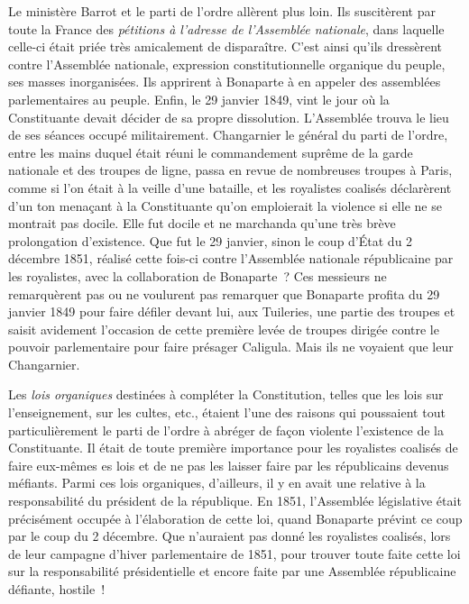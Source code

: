 \documentclass[french,twoside]{book} %
\begin{document}
Le ministère Barrot et le parti de l’ordre allèrent plus loin. Ils suscitèrent par toute la France des \emph{pétitions à l’adresse de l’Assemblée nationale}, dans laquelle celle-ci était priée très amicalement de disparaître. C’est ainsi qu’ils dressèrent contre l’Assemblée nationale, expression constitutionnelle organique du peuple, ses masses inorganisées. Ils apprirent à Bonaparte à en appeler des assemblées parlementaires au peuple. Enfin, le 29 janvier 1849, vint le jour où la Constituante devait décider de sa propre dissolution. L’Assemblée trouva le lieu de ses séances occupé militairement. Changarnier le général du parti de l’ordre, entre les mains duquel était réuni le commandement suprême de la garde nationale et des troupes de ligne, passa en revue de nombreuses troupes à Paris, comme si l’on était à la veille d’une bataille, et les royalistes coalisés déclarèrent d’un ton menaçant à la Constituante qu’on emploierait la violence si elle ne se montrait pas docile. Elle fut docile et ne marchanda qu’une très brève prolongation d’existence. Que fut le 29 janvier, sinon le coup d’État du 2 décembre 1851, réalisé cette fois-ci contre l’Assemblée nationale républicaine par les royalistes, avec la collaboration de Bonaparte ? Ces messieurs ne remarquèrent pas ou ne voulurent pas remarquer que Bonaparte profita du 29 janvier 1849 pour faire défiler devant lui, aux Tuileries, une partie des troupes et saisit avidement l’occasion de cette première levée de troupes dirigée contre le pouvoir parlementaire pour faire présager Caligula. Mais ils ne voyaient que leur Changarnier.\par
Les \emph{lois organiques} destinées à compléter la Constitution, telles que les lois sur l’enseignement, sur les cultes, etc., étaient l’une des raisons qui poussaient tout particulièrement le parti de l’ordre à abréger de façon violente l’existence de la Constituante. Il était de toute première importance pour les royalistes coalisés de faire eux-mêmes es lois et de ne pas les laisser faire par les républicains devenus méfiants. Parmi ces lois organiques, d’ailleurs, il y en avait une relative à la responsabilité du président de la république. En 1851, l’Assemblée législative était précisément occupée à l’élaboration de cette loi, quand Bonaparte prévint ce coup par le coup du 2 décembre. Que n’auraient pas donné les royalistes coalisés, lors de leur campagne d’hiver parlementaire de 1851, pour trouver toute faite cette loi sur la responsabilité présidentielle et encore faite par une Assemblée républicaine défiante, hostile !\par
\end{document}
